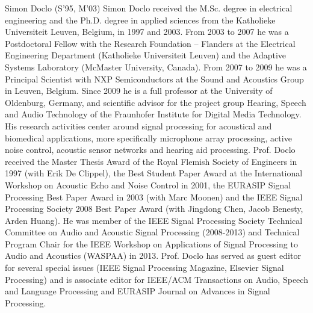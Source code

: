 \documentclass[10pt]{IEEEtran}
\begin{document}
\begin{IEEEbiography}{Simon Doclo}
  (S'95, M'03) Simon Doclo received the M.Sc. degree in electrical engineering and the Ph.D. degree in applied sciences from the Katholieke Universiteit Leuven, Belgium, in 1997 and 2003. From 2003 to 2007 he was a Postdoctoral Fellow with the Research Foundation – Flanders at the Electrical Engineering Department (Katholieke Universiteit Leuven) and the Adaptive Systems Laboratory (McMaster University, Canada). From 2007 to 2009 he was a Principal Scientist with NXP Semiconductors at the Sound and Acoustics Group in Leuven, Belgium. Since 2009 he is a full professor at the University of Oldenburg, Germany, and scientific advisor for the project group Hearing, Speech and Audio Technology of the Fraunhofer Institute for Digital Media Technology. His research activities center around signal processing for acoustical and biomedical applications, more specifically microphone array processing, active noise control, acoustic sensor networks and hearing aid processing.
Prof. Doclo received the Master Thesis Award of the Royal Flemish Society of Engineers in 1997 (with Erik De Clippel), the Best Student Paper Award at the International Workshop on Acoustic Echo and Noise Control in 2001, the EURASIP Signal Processing Best Paper Award in 2003 (with Marc Moonen) and the IEEE Signal Processing Society 2008 Best Paper Award (with Jingdong Chen, Jacob Benesty, Arden Huang). He was member of the IEEE Signal Processing Society Technical Committee on Audio and Acoustic Signal Processing (2008-2013) and Technical Program Chair for the IEEE Workshop on Applications of Signal Processing to Audio and Acoustics (WASPAA) in 2013. Prof. Doclo has served as guest editor for several special issues (IEEE Signal Processing Magazine, Elsevier Signal Processing) and is associate editor for IEEE/ACM Transactions on Audio, Speech and Language Processing and EURASIP Journal on Advances in Signal Processing. 
\end{IEEEbiography}
\end{document}
